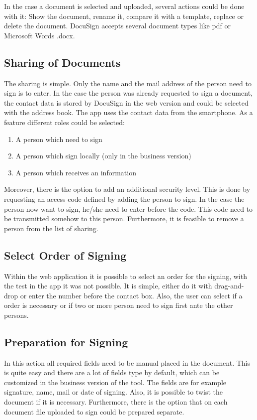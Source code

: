 In the case a document is selected and uploaded, several actions could be done with it: Show the document, rename it, compare it with a template, replace or delete the document. DocuSign accepts several document types like \gls{pdf} or Microsoft Words .docx.

\subsection{Sharing of Documents}
The sharing is simple. Only the name and the mail address of the person need to sign is to enter. In the case the person was already requested to sign a document, the contact data is stored by DocuSign in the web version and could be selected with the address book. The \gls{app} uses the contact data from the smartphone.
As a feature different roles could be selected:
\begin{enumerate}
	\item A person which need to sign
	\item A person which sign locally (only in the business version)
	\item A person which receives an information
\end{enumerate}
Moreover, there is the option to add an additional security level. This is done by requesting an access code defined by adding the person to sign. In the case the person now want to sign, he/she need to enter before the code. This code need to be transmitted somehow to this person. Furthermore, it is feasible to remove a person from the list of sharing. 

\subsection{Select Order of Signing}
Within the web application it is possible to select an order for the signing, with the test in the \gls{app} it was not possible. It is simple, either do it with drag-and-drop or enter the number before the contact box. Also, the user can select if a order is necessary or if two or more person need to sign first ante the other persons.

\subsection{Preparation for Signing}
In this action all required fields need to be manual placed in the document. This is quite easy and there are a lot of fields type by default, which can be customized in the business version of the tool. The fields are for example signature, name, mail or date of signing.
Also, it is possible to twist the document if it is necessary. Furthermore, there is the option that on each document file uploaded to sign could be prepared separate. 

